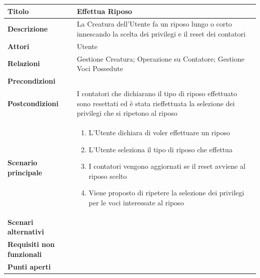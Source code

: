 \documentclass[a4paper, 11pt]{article}
\begin{document}
\begin{center}
\begin{tabular}{ |p{5cm}|p{9.5cm}|  }
\hline
\textbf{Titolo} & Effettua Riposo \\
\hline
\textbf{Descrizione} & La Creatura dell'Utente fa un riposo lungo o corto innescando la scelta dei privilegi e il reset dei contatori \\
\hline
\textbf{Attori} & Utente \\
\hline
\textbf{Relazioni} & Gestione Creatura; Operazione su Contatore; Gestione Voci Possedute \\
\hline
\textbf{Precondizioni} & \\
\hline
\textbf{Postcondizioni} & I contatori che dichiarano il tipo di riposo effettuato sono resettati ed è stata rieffettuata la selezione dei privilegi che si ripetono al riposo\\
\hline
\textbf{Scenario principale} & 
\begin{enumerate}
    \item L'Utente dichiara di voler effettuare un riposo
    \item L'Utente seleziona il tipo di riposo che effettua
    \item I contatori vengono aggiornati se il reset avviene al riposo scelto
    \item Viene proposto di ripetere la selezione dei privilegi per le voci interessate al riposo
\end{enumerate}\\
\hline
\textbf{Scenari alternativi} & \\
\hline
\textbf{Requisiti non funzionali} & \\
\hline
\textbf{Punti aperti} & \\
\hline
\end{tabular}

\vspace{3em}


\end{center}
\end{document}
